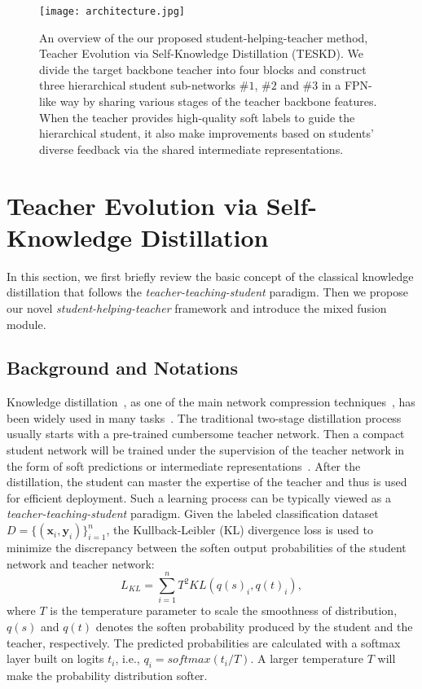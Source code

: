 \documentclass[letterpaper]{article} %
\begin{document}
\begin{figure*}[t]
	\centering
	\texttt{[image: architecture.jpg]}
	\caption{
		An overview of the our proposed student-helping-teacher method, Teacher Evolution via Self-Knowledge Distillation (TESKD). We divide the target backbone teacher into four blocks and construct three hierarchical student sub-networks $\#1$, $\#2$ and $\#3$ in a FPN-like way by sharing various stages of the teacher backbone features. When the teacher provides high-quality soft labels to guide the hierarchical student, it also make improvements based on students' diverse feedback via the shared intermediate representations.
	}
	\label{fig:architecture}
\end{figure*}

\section{Teacher Evolution via Self-Knowledge Distillation}
In this section, we first briefly review the basic concept of the classical knowledge distillation that follows the \textit{teacher-teaching-student} paradigm. Then we propose our novel \textit{student-helping-teacher} framework and introduce the mixed fusion module.

\subsection{Background and Notations}

Knowledge distillation~\cite{hinton2015distilling}, as one of the main network compression techniques~\cite{wu2016quantized,molchanov2016pruning}, has been widely used in many tasks~\cite{li2017mimicking,liu2019structured,zhang2019fast}. The traditional two-stage distillation process usually starts with a pre-trained cumbersome teacher network. Then a compact student network will be trained under the supervision of the teacher network in the form of soft predictions or intermediate representations~\cite{romero2014fitnets,yim2017gift}. After the distillation, the student can master the expertise of the teacher and thus is used for efficient deployment.
Such a learning process can be typically viewed as a \textit{teacher-teaching-student} paradigm. 
Given the labeled classification dataset $D=\{(\textbf{x}_{i},\textbf{y}_{i})\}_{i=1}^{n}$, the Kullback-Leibler (KL) divergence loss is used to minimize the discrepancy between the soften output probabilities of the student network and teacher network:
\begin{equation}
L_{KL} = \sum_{i=1}^{n}T^{2} KL(q(s)_{i}, q(t)_{i}),
\end{equation}
where $T$ is the temperature parameter to scale the smoothness of distribution, $q(s)$ and $q(t)$ denotes the soften probability produced by the student and the teacher, respectively. The predicted probabilities are calculated with a softmax layer built on logits $t_{i}$, i.e., $q_{i}=softmax(t_{i}/T)$. A larger temperature $T$ will make the probability distribution softer.
\end{document}
